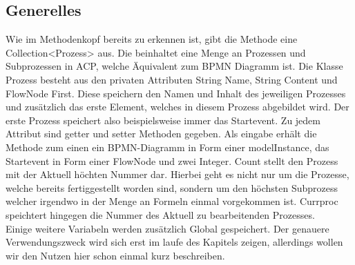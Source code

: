 \subsection{Generelles}\label{Generelles}
Wie im Methodenkopf bereits zu erkennen ist, gibt die Methode eine Collection<Prozess> aus. Die beinhaltet eine Menge an Prozessen und Subprozessen in ACP, welche Äquivalent zum BPMN Diagramm ist. Die Klasse Prozess besteht aus den privaten Attributen String Name, String Content und FlowNode First. Diese speichern den Namen und Inhalt des jeweiligen Prozesses und zusätzlich das erste Element, welches in diesem Prozess abgebildet wird. Der erste Prozess speichert also beispielsweise immer das Startevent. Zu jedem Attribut sind getter und setter Methoden gegeben. Als eingabe erhält die Methode zum einen ein BPMN-Diagramm in Form einer modelInstance, das Startevent in Form einer FlowNode und zwei Integer. Count stellt den Prozess mit der Aktuell höchten Nummer dar. Hierbei geht es nicht nur um die Prozesse, welche bereits fertiggestellt worden sind, sondern um den höchsten Subprozess welcher irgendwo in der Menge an Formeln einmal vorgekommen ist. Currproc speichtert hingegen die Nummer des Aktuell zu bearbeitenden Prozesses. \\
Einige weitere Variabeln werden zusätzlich Global gespeichert. Der genauere Verwendungszweck wird sich erst im laufe des Kapitels zeigen, allerdings wollen wir den Nutzen hier schon einmal kurz beschreiben.\\
